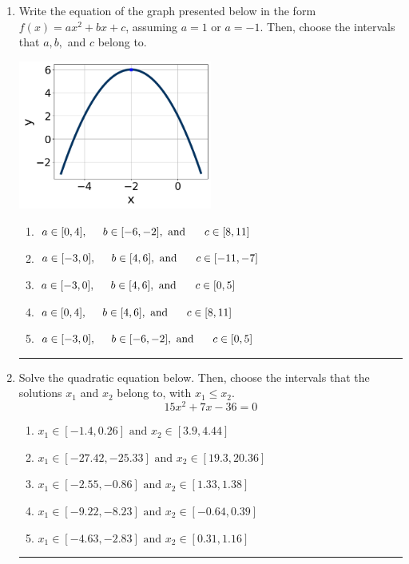 \documentclass[14pt]{extbook}
\newcommand{\litem}[1]{\item#1\hspace*{-1cm}\rule{\textwidth}{0.4pt}}
\begin{document}
\begin{enumerate}
{\begin{enumerate}[label=\Alph*.]
\end{enumerate} }
\litem{
Write the equation of the graph presented below in the form $f(x)=ax^2+bx+c$, assuming  $a=1$ or $a=-1$. Then, choose the intervals that $a, b,$ and $c$ belong to.
\begin{center}
    \includegraphics[width=0.5\textwidth]{../Figures/quadraticGraphToEquationCopyA.png}
\end{center}
\begin{enumerate}[label=\Alph*.]
\item \( a \in [0, 4], \hspace*{5mm} b \in [-6, -2], \text{ and } \hspace*{5mm} c \in [8, 11] \)
\item \( a \in [-3, 0], \hspace*{5mm} b \in [4, 6], \text{ and } \hspace*{5mm} c \in [-11, -7] \)
\item \( a \in [-3, 0], \hspace*{5mm} b \in [4, 6], \text{ and } \hspace*{5mm} c \in [0, 5] \)
\item \( a \in [0, 4], \hspace*{5mm} b \in [4, 6], \text{ and } \hspace*{5mm} c \in [8, 11] \)
\item \( a \in [-3, 0], \hspace*{5mm} b \in [-6, -2], \text{ and } \hspace*{5mm} c \in [0, 5] \)

\end{enumerate} }
\litem{
Solve the quadratic equation below. Then, choose the intervals that the solutions $x_1$ and $x_2$ belong to, with $x_1 \leq x_2$.\[ 15x^{2} +7 x -36 = 0 \]\begin{enumerate}[label=\Alph*.]
\item \( x_1 \in [-1.4, 0.26] \text{ and } x_2 \in [3.9, 4.44] \)
\item \( x_1 \in [-27.42, -25.33] \text{ and } x_2 \in [19.3, 20.36] \)
\item \( x_1 \in [-2.55, -0.86] \text{ and } x_2 \in [1.33, 1.38] \)
\item \( x_1 \in [-9.22, -8.23] \text{ and } x_2 \in [-0.64, 0.39] \)
\item \( x_1 \in [-4.63, -2.83] \text{ and } x_2 \in [0.31, 1.16] \)

\end{enumerate} }
\end{enumerate}
\end{document}
